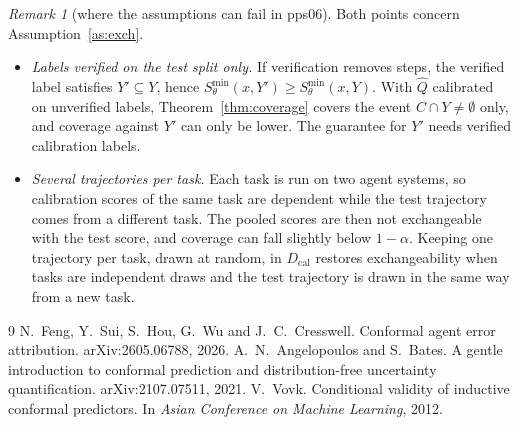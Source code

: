 \documentclass[10pt,a4paper]{article}
\theoremstyle{definition}
\theoremstyle{remark}
\newtheorem{remark}{Remark}
\newcommand{\C}{C}
\newcommand{\Qhat}{\widehat Q}
\newcommand{\Smin}{S^{\min}}
\newcommand{\Dcal}{D_{\mathrm{cal}}}
\begin{document}
\begin{remark}[where the assumptions can fail in pps06] \label{rem:fail}
Both points concern Assumption~\ref{as:exch}.
\begin{itemize}
\item \emph{Labels verified on the test split only.} If verification removes steps, the verified label satisfies $Y'\subseteq Y$, hence $\Smin_\theta(x,Y')\ge\Smin_\theta(x,Y)$. With $\Qhat$ calibrated on unverified labels, Theorem~\ref{thm:coverage} covers the event $\C\cap Y\neq\emptyset$ only, and coverage against $Y'$ can only be lower. The guarantee for $Y'$ needs verified calibration labels.
\item \emph{Several trajectories per task.} Each task is run on two agent systems, so calibration scores of the same task are dependent while the test trajectory comes from a different task. The pooled scores are then not exchangeable with the test score, and coverage can fall slightly below $1-\alpha$. Keeping one trajectory per task, drawn at random, in $\Dcal$ restores exchangeability when tasks are independent draws and the test trajectory is drawn in the same way from a new task.
\end{itemize}
\end{remark}

\begin{thebibliography}{9}\small
{} N.~Feng, Y.~Sui, S.~Hou, G.~Wu and J.~C.~Cresswell. Conformal agent error attribution. arXiv:2605.06788, 2026.
 A.~N.~Angelopoulos and S.~Bates. A gentle introduction to conformal prediction and distribution-free uncertainty quantification. arXiv:2107.07511, 2021.
 V.~Vovk. Conditional validity of inductive conformal predictors. In \emph{Asian Conference on Machine Learning}, 2012.
\end{thebibliography}
\end{document}

